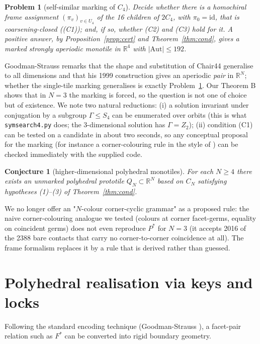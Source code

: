 \documentclass[11pt,a4paper]{article}
\theoremstyle{plain}
\newtheorem{conjecture}[theorem]{Conjecture}
\newtheorem{problem}[theorem]{Problem}
\theoremstyle{definition}
\begin{document}
\begin{problem}[self-similar marking of $C_4$]\label{prob:N4}
Decide whether there is a homochiral frame assignment $(\pi_v)_{v \in U_4}$ of the 16 children of $2C_4$, with $\pi_0 = \mathrm{\mathrm{id}}$, that is coarsening-closed ((C1)); and, if so, whether (C2) and (C3) hold for it. A positive answer, by Proposition~\ref{prop:cert} and Theorem~\ref{thm:cond}, gives a marked strongly aperiodic monotile in $\mathbb{R}^4$ with $|\mathrm{Aut}| \le  192$.
\end{problem}


Goodman-Strauss \cite{gs2026} remarks that the shape and substitution of Chair44 generalise to all dimensions and that his 1999 construction \cite{gs99} gives an aperiodic \emph{pair} in $\mathbb{R}^N$; whether the single-tile marking generalises is exactly Problem~\ref{prob:N4}. Our Theorem B shows that in $N = 3$ the marking is forced, so the question is not one of choice but of existence. We note two natural reductions: (i) a solution invariant under conjugation by a subgroup $\Gamma \le  S_4$ can be enumerated over orbits (this is what \texttt{symsearch4.py} does; the $3$-dimensional solution has $\Gamma = Z_2$); (ii) condition (C1) can be tested on a candidate in about two seconds, so any conceptual proposal for the marking (for instance a corner-colouring rule in the style of \cite{gs2026}) can be checked immediately with the supplied code.

\begin{conjecture}[higher-dimensional polyhedral monotiles]
For each $N \ge  4$ there exists an unmarked polyhedral prototile $Q_N \subset \mathbb{R}^N$ based on $C_N$ satisfying hypotheses (1)--(3) of Theorem~\ref{thm:cond}.
\end{conjecture}


We no longer offer an "$N$-colour corner-cyclic grammar" as a proposed rule: the naive corner-colouring analogue we tested (colours at corner facet-germs, equality on coincident germs) does not even reproduce $P^*$ for $N = 3$ (it accepts 2016 of the 2388 bare contacts that carry no corner-to-corner coincidence at all). The frame formalism replaces it by a rule that is derived rather than guessed.

\section{Polyhedral realisation via keys and locks}\label{sec:poly}

Following the standard encoding technique (Goodman-Strauss \cite{gs98,gs2026}), a facet-pair relation such as $F^*$ can be converted into rigid boundary geometry.
\end{document}
